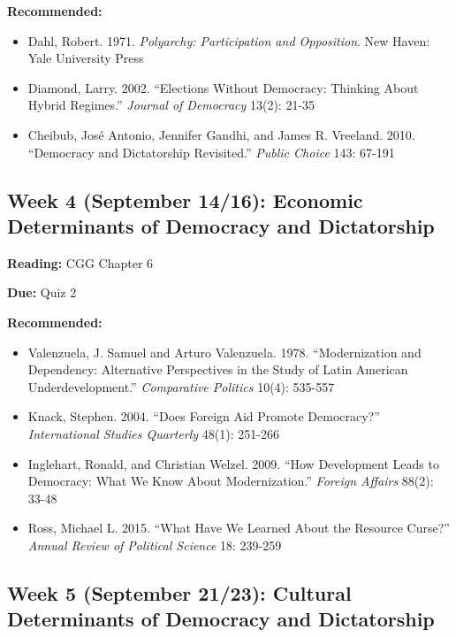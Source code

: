 \documentclass[
  11pt,
]{article}
\providecommand{\tightlist}{%
  \setlength{\itemsep}{0pt}\setlength{\parskip}{0pt}}
\begin{document}
\textbf{Recommended:}

\begin{itemize}
\tightlist
\item
  Dahl, Robert. 1971. \emph{Polyarchy: Participation and Opposition}.
  New Haven: Yale University Press\\
\item
  Diamond, Larry. 2002. ``Elections Without Democracy: Thinking About
  Hybrid Regimes.'' \emph{Journal of Democracy} 13(2): 21-35
\item
  Cheibub, José Antonio, Jennifer Gandhi, and James R. Vreeland. 2010.
  ``Democracy and Dictatorship Revisited.'' \emph{Public Choice} 143:
  67-191
\end{itemize}

\hypertarget{week-4-september-1416-economic-determinants-of-democracy-and-dictatorship}{%
\subsection{Week 4 (September 14/16): Economic Determinants of Democracy
and
Dictatorship}\label{week-4-september-1416-economic-determinants-of-democracy-and-dictatorship}}

\textbf{Reading:} CGG Chapter 6

\textbf{Due:} Quiz 2

\textbf{Recommended:}

\begin{itemize}
\tightlist
\item
  Valenzuela, J. Samuel and Arturo Valenzuela. 1978. ``Modernization and
  Dependency: Alternative Perspectives in the Study of Latin American
  Underdevelopment.'' \emph{Comparative Politics} 10(4): 535-557
\item
  Knack, Stephen. 2004. ``Does Foreign Aid Promote Democracy?''
  \emph{International Studies Quarterly} 48(1): 251-266
\item
  Inglehart, Ronald, and Christian Welzel. 2009. ``How Development Leads
  to Democracy: What We Know About Modernization.'' \emph{Foreign
  Affairs} 88(2): 33-48
\item
  Ross, Michael L. 2015. ``What Have We Learned About the Resource
  Curse?'' \emph{Annual Review of Political Science} 18: 239-259
\end{itemize}

\hypertarget{week-5-september-2123-cultural-determinants-of-democracy-and-dictatorship}{%
\subsection{Week 5 (September 21/23): Cultural Determinants of Democracy
and
Dictatorship}\label{week-5-september-2123-cultural-determinants-of-democracy-and-dictatorship}}
\end{document}
